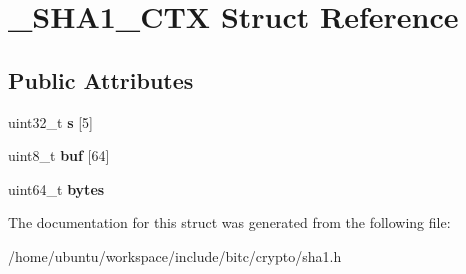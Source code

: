 \hypertarget{struct__SHA1__CTX}{\section{\-\_\-\-S\-H\-A1\-\_\-\-C\-T\-X Struct Reference}
\label{struct__SHA1__CTX}
}
\subsection*{Public Attributes}
\begin{DoxyCompactItemize}
\item 
\hypertarget{struct__SHA1__CTX_a96da7459ae9f976d7381e69c911b90c6}{uint32\-\_\-t {\bfseries s} \mbox{[}5\mbox{]}}\label{struct__SHA1__CTX_a96da7459ae9f976d7381e69c911b90c6}

\item 
\hypertarget{struct__SHA1__CTX_aeaba6977421136b2c1c9bf23fd9b1467}{uint8\-\_\-t {\bfseries buf} \mbox{[}64\mbox{]}}\label{struct__SHA1__CTX_aeaba6977421136b2c1c9bf23fd9b1467}

\item 
\hypertarget{struct__SHA1__CTX_ab5522a7bbf69f446853ffc3a0913cfdb}{uint64\-\_\-t {\bfseries bytes}}\label{struct__SHA1__CTX_ab5522a7bbf69f446853ffc3a0913cfdb}

\end{DoxyCompactItemize}


The documentation for this struct was generated from the following file\-:\begin{DoxyCompactItemize}
\item 
/home/ubuntu/workspace/include/bitc/crypto/sha1.\-h\end{DoxyCompactItemize}
